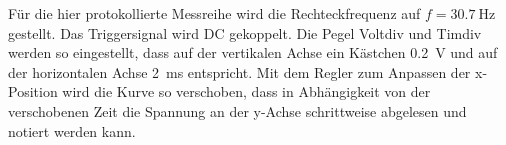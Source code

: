 \noindent
Für die hier protokollierte Messreihe wird die Rechteckfrequenz auf $f = \qty{30.7}{\hertz}$ gestellt.
Das Triggersignal wird DC gekoppelt.
Die Pegel Voltdiv und Timdiv werden so eingestellt, 
dass auf der vertikalen Achse ein Kästchen \qty[]{0.2}{\volt} und auf der horizontalen Achse \qty{2}{\ms} entspricht.
Mit dem Regler zum Anpassen der x-Position wird die Kurve so verschoben, 
dass in Abhängigkeit von der verschobenen Zeit die Spannung an der y-Achse schrittweise abgelesen und notiert werden kann.